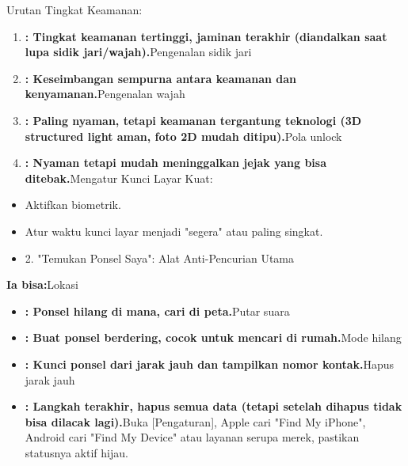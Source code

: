 


Urutan Tingkat Keamanan:


\begin{enumerate}
  \item \textbf{: Tingkat keamanan tertinggi, jaminan terakhir (diandalkan saat lupa sidik jari/wajah).}Pengenalan sidik jari
  \item \textbf{: Keseimbangan sempurna antara keamanan dan kenyamanan.}Pengenalan wajah
  \item \textbf{: Paling nyaman, tetapi keamanan tergantung teknologi (3D structured light aman, foto 2D mudah ditipu).}Pola unlock
  \item \textbf{: Nyaman tetapi mudah meninggalkan jejak yang bisa ditebak.}Mengatur Kunci Layar Kuat:
\end{enumerate}


\begin{itemize}
  \item Aktifkan biometrik.
  \item Atur waktu kunci layar menjadi "segera" atau paling singkat.
  \item 2. "Temukan Ponsel Saya": Alat Anti-Pencurian Utama
\end{itemize}


\textbf{Ia bisa:}Lokasi

\begin{itemize}
  \item \textbf{: Ponsel hilang di mana, cari di peta.}Putar suara
  \item \textbf{: Buat ponsel berdering, cocok untuk mencari di rumah.}Mode hilang
  \item \textbf{: Kunci ponsel dari jarak jauh dan tampilkan nomor kontak.}Hapus jarak jauh
  \item \textbf{: Langkah terakhir, hapus semua data (tetapi setelah dihapus tidak bisa dilacak lagi).}Buka [Pengaturan], Apple cari "Find My iPhone", Android cari "Find My Device" atau layanan serupa merek, pastikan statusnya aktif hijau.
\end{itemize}

